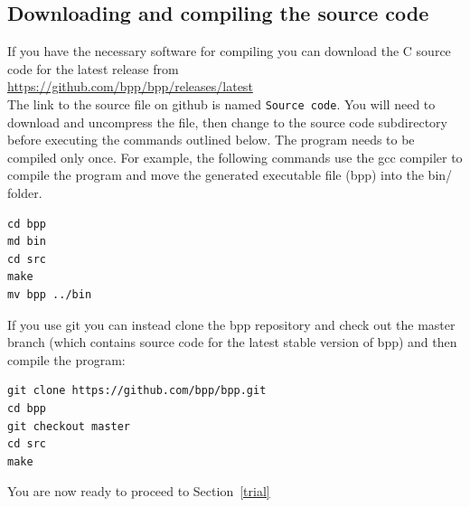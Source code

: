 \documentclass{book}
\numberwithin{equation}{section} \renewcommand{\baselinestretch}{0.55}
\begin{document}
\subsection{Downloading and compiling the source code}
If you have the necessary software for compiling you can download the
C source code for the latest release from
\newline \noindent \vspace{0.1pt} \\
\href{https://github.com/bpp/bpp/releases/latest}{https://github.com/bpp/bpp/releases/latest}
\newline \noindent \vspace{0.1pt} \\
The link to the source file on github is named \texttt{Source
  code}. You will need to download and uncompress the file, then
change to the source code subdirectory before executing the commands
outlined below.  The program needs to be compiled only once.  For
example, the following commands use the gcc compiler to compile the
program and move the generated executable file (bpp) into the bin/
folder.  {\color{red}
\begin{verbatim}
cd bpp
md bin
cd src
make
mv bpp ../bin
\end{verbatim}}
  \noindent
  If you use git you can instead clone the bpp repository and check
  out the master branch (which contains source code for the latest
  stable version of bpp) and then compile the program: {\color{red}
\begin{verbatim}
git clone https://github.com/bpp/bpp.git
cd bpp
git checkout master
cd src
make
\end{verbatim}}
    \noindent
    You are now ready to proceed to Section~\ref{trial}
\end{document}
